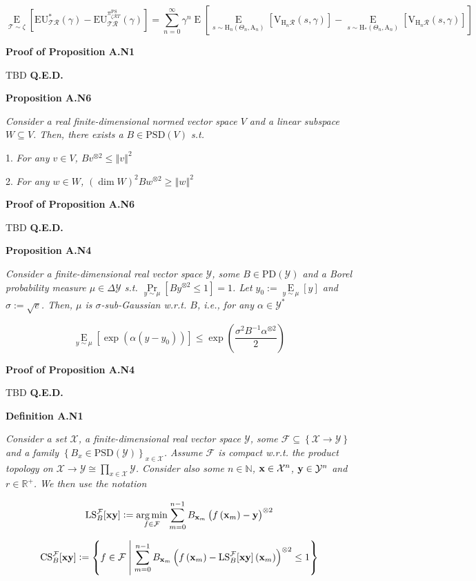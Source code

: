 \documentclass[a4paper]{article}
\newcommand{\Co}[1]{}
\newcommand{\AP}[1]{\left(#1\right)}
\newcommand{\AB}[1]{\left[#1\right]}
\newcommand{\AC}[1]{\left\{#1\right\}}
\newcommand{\ACM}[2]{\left\{#1\;\middle\vert\;#2\right\}}
\newcommand{\Pa}[2]{\underset{#1}{\operatorname{Pr}}\AB{#2}}
\newcommand{\Ea}[2]{\underset{#1}{\operatorname{E}}\AB{#2}}
\newcommand{\Argmin}[1]{\underset{#1}{\operatorname{arg\,min}}\,}
\newcommand{\Nats}{\mathbb{N}}
\newcommand{\Reals}{\mathbb{R}}
\newcommand{\PD}{\mathrm{PD}}
\newcommand{\PSD}{\mathrm{PSD}}
\newcommand{\Norm}[1]{\left\Vert #1 \right\Vert}
\newcommand{\B}{B}
\newcommand{\X}{\mathcal{X}}
\newcommand{\Y}{\mathcal{Y}}
\newcommand{\F}{\mathcal{F}}
\newcommand{\R}{\mathcal{R}}
\newcommand{\T}{\mathcal{T}}
\newcommand{\V}{\mathrm{V}}
\newcommand{\EU}{\mathrm{EU}}
\newcommand{\PSR}{\text{PS}}
\newcommand{\LS}{\mathrm{LS}}
\newcommand{\CS}{\mathrm{CS}}
\newcommand{\AT}{\mathrm{A}}
\newcommand{\THy}{\mathrm{H}_*}
\newcommand{\SHy}{\mathrm{H}}
\begin{document}
$$\Ea{\T\sim\zeta}{\EU^*_{\T\R}(\gamma)-\EU^{\pi_{\zeta\R T}^{\PSR}}_{\T\R}(\gamma)}=\sum_{n=0}^\infty\gamma^{n}\Ea{}{\Ea{s\sim \SHy_n\AP{\Theta_n,\AT_n}}{\V_{\SHy_n\R}(s,\gamma)}-\Ea{s\sim \THy\AP{\Theta_n,\AT_n}}{\V_{\SHy_n\R}(s,\gamma)}}$$

\textbf{Proof of Proposition A.N1}\Co{b}


TBD \textbf{Q.E.D.}\Co{b}

\textbf{Proposition A.N6}\Co{b}

\textit{Consider a real finite-dimensional normed vector space $V$ and a linear subspace $W\subseteq V$. Then, there exists a $\B \in\PSD(V)$ s.t.}\Co{i}

1. \textit{For any $v\in V$, $\B v^{\otimes 2}\leq\Norm{v}^2$}\Co{i}

2. \textit{For any $w\in W$, $\AP{\dim{W}}^2 \B w^{\otimes 2}\geq \Norm{w}^2$}\Co{i}

\textbf{Proof of Proposition A.N6}\Co{b}

TBD \textbf{Q.E.D.}\Co{b}

\textbf{Proposition A.N4}\Co{b}

\textit{Consider a finite-dimensional real vector space $\Y$, some $\B \in\PD(\Y)$ and a Borel probability measure $\mu\in\Delta\Y$ s.t. $\Pa{y\sim\mu}{\B y^{\otimes 2} \leq 1} = 1$. Let $y_0:=\Ea{y\sim\mu}{y}$ and $\sigma:=\sqrt{e}$. Then, $\mu$ is $\sigma$-sub-Gaussian w.r.t. $\B $, i.e., for any $\alpha\in\Y^*$}\Co{i}

$$\Ea{y\sim\mu}{\exp\AP{\alpha\AP{y-y_0}}} \leq \exp\AP{\frac{\sigma^2\B ^{-1}\alpha^{\otimes 2}}{2}}$$

\textbf{Proof of Proposition A.N4}\Co{b}

TBD \textbf{Q.E.D.}\Co{b}

\textbf{Definition A.N1}\Co{b}

\textit{Consider a set $\X$, a finite-dimensional real vector space $\Y$, some $\F\subseteq\AC{\X\rightarrow\Y}$ and a family $\AC{\B _x\in\PSD(\Y)}_{x\in\X}$. Assume $\F$ is compact w.r.t. the product topology on $\X\rightarrow\Y\cong\prod_{x\in\X}\Y$. Consider also some $n\in\Nats$, $\bold{x}\in\X^n$, $\bold{y}\in\Y^n$ and $r\in\Reals^+$. We then use the notation}\Co{i}

$$\LS^{\F}_\B [\bold{xy}]:=\Argmin{f\in\F}{\sum_{m=0}^{n-1}\B _{\bold{x}_m}\AP{f\AP{\bold{x}_m}-\bold{y} }^{\otimes2}}$$

$$\CS^{\F}_{\B }[\bold{xy}]:=\ACM{f\in\F}{\sum_{m=0}^{n-1}\B _{\bold{x}_m}\AP{f\AP{\bold{x}_m}-\LS_\B ^\F[\bold{xy}]\AP{\bold{x}_m}}^{\otimes2}\leq 1}$$
\end{document}
